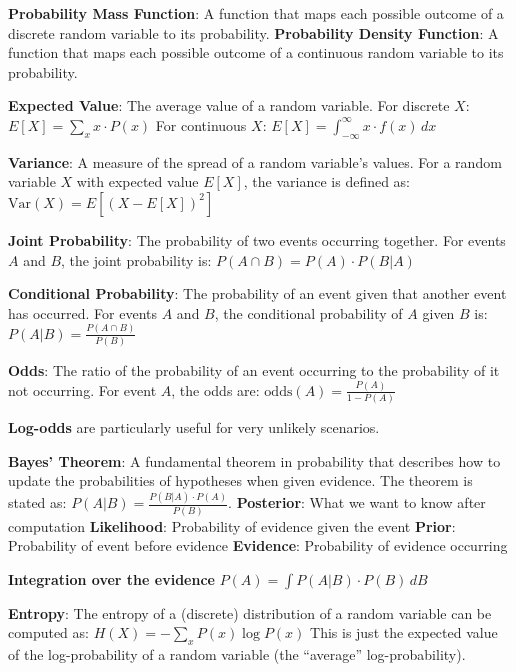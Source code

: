 \documentclass{article}
\begin{document}
\noindent \textbf{Probability Mass Function}: A function that maps each possible outcome of a discrete random variable to its probability.
\noindent \textbf{Probability Density Function}: A function that maps each possible outcome of a continuous random variable to its probability.


\noindent \textbf{Expected Value}: The average value of a random variable. For discrete $X$:
$ E[X] = \sum_{x} x \cdot P(x) $
For continuous $X$:
$ E[X] = \int_{-\infty}^{\infty} x \cdot f(x) \, dx $

\noindent \textbf{Variance}: A measure of the spread of a random variable's values. For a random variable $X$ with expected value $E[X]$, the variance is defined as:
$ \text{Var}(X) = E[(X - E[X])^2] $


\noindent \textbf{Joint Probability}: The probability of two events occurring together. For events $A$ and $B$, the joint probability is:
$ P(A \cap B) = P(A) \cdot P(B|A) $

\noindent \textbf{Conditional Probability}: The probability of an event given that another event has occurred. For events $A$ and $B$, the conditional probability of $A$ given $B$ is:
$ P(A|B) = \frac{P(A \cap B)}{P(B)} $

\noindent \textbf{Odds}: The ratio of the probability of an event occurring to the probability of it not occurring. For event $A$, the odds are:
$ \text{odds}(A) = \frac{P(A)}{1 - P(A)} $

\noindent \textbf{Log-odds} are particularly useful for very unlikely scenarios.

\noindent \textbf{Bayes' Theorem}: A fundamental theorem in probability that describes how to update the probabilities of hypotheses when given evidence. The theorem is stated as:
$ P(A|B) = \frac{P(B|A) \cdot P(A)}{P(B)} $.
\textbf{Posterior}: What we want to know after computation
\textbf{Likelihood}: Probability of evidence given the event
\textbf{Prior}: Probability of event before evidence
\textbf{Evidence}: Probability of evidence occurring

\noindent \textbf{Integration over the evidence}
$ P(A) = \int P(A|B) \cdot P(B) \, dB $

\noindent \textbf{Entropy}:
The entropy of a (discrete) distribution of a random variable can be
computed as:
$ H(X) = - \sum_{x} P(x) \log P(x) $
This is just the expected value of the log-probability of a random variable
(the “average” log-probability).
\end{document}
